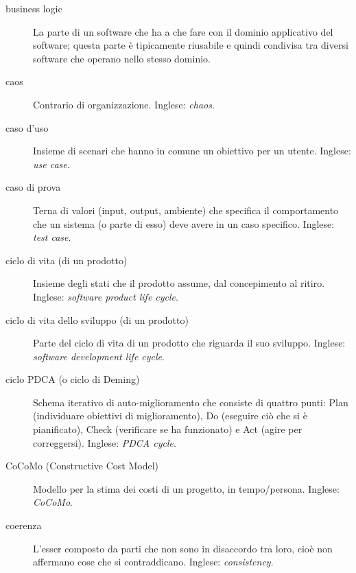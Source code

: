 \documentclass[a4paper]{article}
\begin{document}
\begin{description}
	\item[business logic] 

			La parte di un software che ha a che fare con il dominio applicativo del software; questa parte è tipicamente riusabile e quindi condivisa tra diversi software che operano nello stesso dominio.
			
	\item[caos] 

			Contrario di organizzazione. Inglese: \emph{chaos}.
			
	\item[caso d'uso] 

			Insieme di scenari che hanno in comune un obiettivo per un utente. Inglese: \emph{use case}.
			
	\item[caso di prova] 

			Terna di valori (input, output, ambiente) che specifica il comportamento che un sistema (o parte di esso) deve avere in un caso specifico. Inglese: \emph{test case}.
			
	\item[ciclo di vita (di un prodotto)] 

			Insieme degli stati che il prodotto assume, dal concepimento al ritiro. Inglese: \emph{software product life cycle}.
			
	\item[ciclo di vita dello sviluppo (di un prodotto)] 

			Parte del ciclo di vita di un prodotto che riguarda il suo sviluppo. Inglese: \emph{software development life cycle}.
			
	\item[ciclo PDCA (o ciclo di Deming)] 

			Schema iterativo di auto-miglioramento che consiste di quattro punti: Plan (individuare obiettivi di miglioramento), Do (eseguire ciò che si è pianificato), Check (verificare se ha funzionato) e Act (agire per correggersi). Inglese: \emph{PDCA cycle}.
			
	\item[CoCoMo (Constructive Cost Model)] 

			Modello per la stima dei costi di un progetto, in tempo/persona. Inglese: \emph{CoCoMo}.
			
	\item[coerenza] 

			L'esser composto da parti che non sono in disaccordo tra loro, cioè non affermano cose che si contraddicano. Inglese: \emph{consistency}.
			

\end{description}
\end{document}
